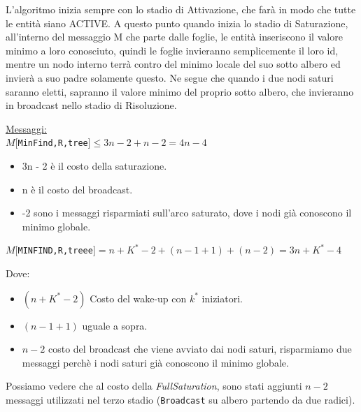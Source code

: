 L'algoritmo inizia sempre con lo stadio di Attivazione, che farà in modo che
tutte le entità siano ACTIVE. A questo punto quando inizia lo stadio di
Saturazione, all'interno del messaggio M che parte dalle foglie, le entità
inseriscono il valore minimo a loro conosciuto, quindi le foglie invieranno
semplicemente il loro id, mentre un nodo interno terrà contro del minimo locale
del suo sotto albero ed invierà a suo padre solamente questo. Ne segue che
quando i due nodi saturi saranno eletti, sapranno il valore minimo del proprio
sotto albero, che invieranno in broadcast nello stadio di Risoluzione.


\underline{Messaggi:}\\
$M[$\texttt{MinFind,R,tree}$] \leq 3n - 2 + n - 2 = 4n - 4$
\begin{itemize}
    \item 3n - 2 è il costo della saturazione.
    \item n è il costo del broadcast.
    \item -2 sono i messaggi risparmiati sull'arco saturato, dove i nodi già
          conoscono il minimo globale.
\end{itemize}

\begin{center}
    $M[$\texttt{MINFIND,R,treee}$] = n + K^* - 2 + (n-1+1) + (n-2) = 3n + K^* -
        4$\\
\end{center}
Dove:
\begin{itemize}
    \item $(n + K^* - 2)$ Costo del wake-up con $k^*$ iniziatori.
    \item $(n-1+1)$ uguale a sopra.
    \item $n-2$ costo del broadcast che viene avviato dai nodi saturi, risparmiamo
          due messaggi perchè i nodi saturi già conoscono il minimo globale.
\end{itemize}
Possiamo vedere che al costo della \textit{FullSaturation}, sono stati aggiunti
$n-2$ messaggi utilizzati nel terzo stadio (\texttt{Broadcast} su albero
partendo da due radici).


